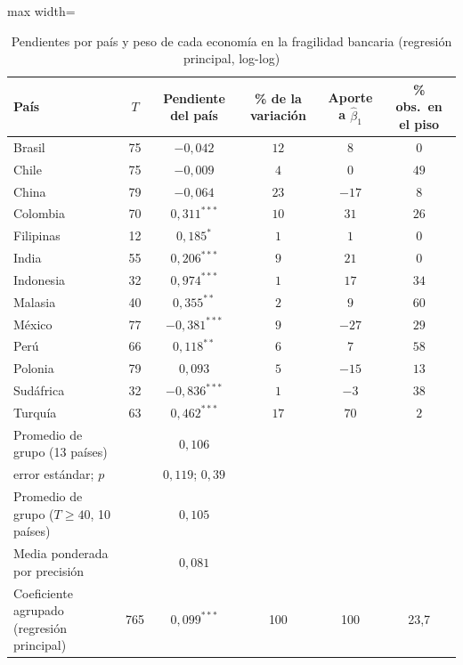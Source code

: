 \begin{table}[htbp]
\centering
\small
\caption[Pendientes por país: fragilidad]{Pendientes por país y peso de cada economía en la fragilidad bancaria (regresión principal, log-log)}
\label{tab:pendientes-pais}
\begin{adjustbox}{max width=\linewidth}
\begin{tabular}{l c c c c c}
\toprule
País & $T$ & Pendiente del país & \% de la variación & Aporte a $\hat\beta_1$ & \% obs.\ en el piso \\
\midrule
Brasil & 75 & $-0{,}042$ & $12$ & $8$ & $0$ \\
Chile & 75 & $-0{,}009$ & $4$ & $0$ & $49$ \\
China & 79 & $-0{,}064$ & $23$ & $-17$ & $8$ \\
Colombia & 70 & $0{,}311^{***}$ & $10$ & $31$ & $26$ \\
Filipinas & 12 & $0{,}185^{*}$ & $1$ & $1$ & $0$ \\
India & 55 & $0{,}206^{***}$ & $9$ & $21$ & $0$ \\
Indonesia & 32 & $0{,}974^{***}$ & $1$ & $17$ & $34$ \\
Malasia & 40 & $0{,}355^{**}$ & $2$ & $9$ & $60$ \\
México & 77 & $-0{,}381^{***}$ & $9$ & $-27$ & $29$ \\
Perú & 66 & $0{,}118^{**}$ & $6$ & $7$ & $58$ \\
Polonia & 79 & $0{,}093$ & $5$ & $-15$ & $13$ \\
Sudáfrica & 32 & $-0{,}836^{***}$ & $1$ & $-3$ & $38$ \\
Turquía & 63 & $0{,}462^{***}$ & $17$ & $70$ & $2$ \\
\midrule
Promedio de grupo (13 países) & & $0{,}106$ & & & \\
\quad error estándar; $p$ & & $0{,}119$; $0{,}39$ & & & \\
Promedio de grupo ($T\geq40$, 10 países) & & $0{,}105$ & & & \\
Media ponderada por precisión & & $0{,}081$ & & & \\
Coeficiente agrupado (regresión principal) & 765 & $0{,}099^{***}$ & 100 & 100 & 23{,}7 \\
\bottomrule
\end{tabular}
\end{adjustbox}

\end{table}
